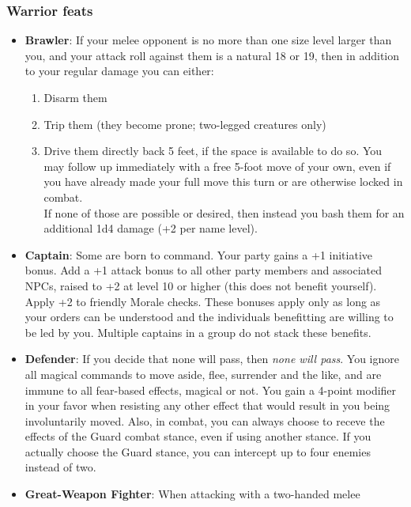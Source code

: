 \documentclass{article}
\begin{document}
\begin{multicols}{2}
\subsubsection{Warrior feats}\label{warrior-feats}

\begin{itemize}
\tightlist
\item
  \textbf{Brawler}: If your melee opponent is no more than one size
  level larger than you, and your attack roll against them is a natural
  18 or 19, then in addition to your regular damage you can either:

  \begin{enumerate}
  \def\labelenumi{\arabic{enumi}.}
  \tightlist
  \item
    Disarm them
  \item
    Trip them (they become prone; two-legged creatures only)
  \item
    Drive them directly back 5 feet, if the space is available to do so.
    You may follow up immediately with a free 5-foot move of your own,
    even if you have already made your full move this turn or are
    otherwise locked in combat.\\
    If none of those are possible or desired, then instead you bash them
    for an additional 1d4 damage (+2 per name level).
  \end{enumerate}
\item
  \textbf{Captain}: Some are born to command. Your party gains a +1
  initiative bonus. Add a +1 attack bonus to all other party members and
  associated NPCs, raised to +2 at level 10 or higher (this does not
  benefit yourself). Apply +2 to friendly Morale checks. These bonuses
  apply only as long as your orders can be understood and the
  individuals benefitting are willing to be led by you. Multiple
  captains in a group do not stack these benefits.
\item
  \textbf{Defender}: If you decide that none will pass, then \emph{none
  will pass}. You ignore all magical commands to move aside, flee,
  surrender and the like, and are immune to all fear-based effects,
  magical or not. You gain a 4-point modifier in your favor when
  resisting any other effect that would result in you being
  involuntarily moved. Also, in combat, you can always choose to receve
  the effects of the Guard combat stance, even if using another stance.
  If you actually choose the Guard stance, you can intercept up to four
  enemies instead of two.
\item
  \textbf{Great-Weapon Fighter}: When attacking with a two-handed melee

\end{itemize}
\end{multicols}
\end{document}
